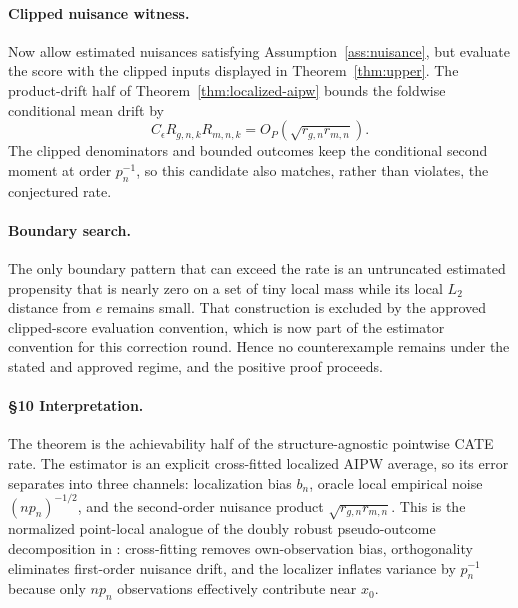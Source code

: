\paragraph{Clipped nuisance witness.}
Now allow estimated nuisances satisfying Assumption~\ref{ass:nuisance}, but evaluate the score with the clipped inputs displayed in Theorem~\ref{thm:upper}.  The product-drift half of Theorem~\ref{thm:localized-aipw} bounds the foldwise conditional mean drift by
\[
  C_\epsilon R_{g,n,k}R_{m,n,k}
  =
  O_P\!\left(\sqrt{r_{g,n}r_{m,n}}\right).
\]
The clipped denominators and bounded outcomes keep the conditional second moment at order $p_n^{-1}$, so this candidate also matches, rather than violates, the conjectured rate.

\paragraph{Boundary search.}
The only boundary pattern that can exceed the rate is an untruncated estimated propensity that is nearly zero on a set of tiny local mass while its local $L_2$ distance from $e$ remains small.  That construction is excluded by the approved clipped-score evaluation convention, which is now part of the estimator convention for this correction round.  Hence no counterexample remains under the stated and approved regime, and the positive proof proceeds.

\paragraph{\S10 Interpretation.}
The theorem is the achievability half of the structure-agnostic pointwise CATE rate.  The estimator is an explicit cross-fitted localized AIPW average, so its error separates into three channels: localization bias $b_n$, oracle local empirical noise $(n p_n)^{-1/2}$, and the second-order nuisance product $\sqrt{r_{g,n}r_{m,n}}$.  This is the normalized point-local analogue of the doubly robust pseudo-outcome decomposition in \cite{Kennedy2023DRCATE}: cross-fitting removes own-observation bias, orthogonality eliminates first-order nuisance drift, and the localizer inflates variance by $p_n^{-1}$ because only $n p_n$ observations effectively contribute near $x_0$.

